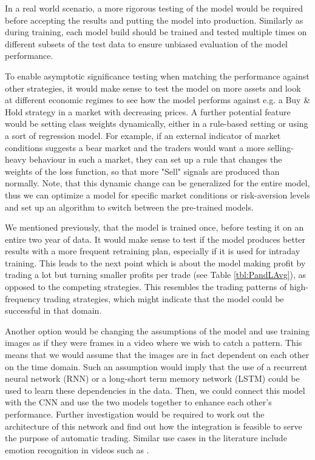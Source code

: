\documentclass[12pt, a4paper]{article}
\begin{document}
In a real world scenario, a more rigorous testing of the model would be required before accepting the results and putting the model into production. Similarly as during training, each model build should be trained and tested multiple times on different subsets of the test data to ensure unbiased evaluation of the model performance.

To enable asymptotic significance testing when matching the performance against other strategies, it would make sense to test the model on more assets and look at different economic regimes to see how the model performs against e.g. a Buy \& Hold strategy in a market with decreasing prices. A further potential feature would be setting class weights dynamically, either in a rule-based setting or using a sort of regression model. For example, if an external indicator of market conditions suggests a bear market and the traders would want a more selling-heavy behaviour in such a market, they can set up a rule that changes the weights of the loss function, so that more "Sell" signals are produced than normally. Note, that this dynamic change can be generalized for the entire model, thus we can optimize a model for specific market conditions or risk-aversion levels and set up an algorithm to switch between the pre-trained models.

We mentioned previously, that the model is trained once, before testing it on an entire two year of data. It would make sense to test if the model produces better results with a more frequent retraining plan, especially if it is used for intraday training. This leads to the next point which is about the model making profit by trading a lot but turning smaller profits per trade (see Table \ref{tbl:PandLAvg}), as opposed to the competing strategies. This resembles the trading patterns of high-frequency trading strategies, which might indicate that the model could be successful in that domain.

Another option would be changing the assumptions of the model and use training images as if they were frames in a video where we wish to catch a pattern. This means that we would assume that the images are in fact dependent on each other on the time domain. Such an assumption would imply that the use of a recurrent neural network (RNN) or a long-short term memory network (LSTM) could be used to learn these dependencies in the data. Then, we could connect this model with the CNN and use the two models together to enhance each other's performance. Further investigation would be required to work out the architecture of this network and find out how the integration is feasible to serve the purpose of automatic trading. Similar use cases in the literature include emotion recognition in videos such as \cite{ebrahimi2015recurrent}.
\end{document}
